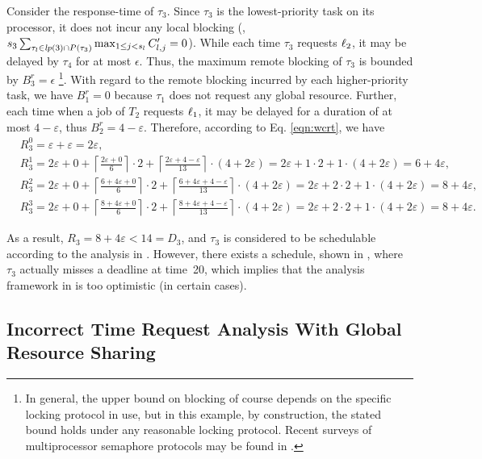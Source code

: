 Consider the response-time of $\tau_3$. Since $\tau_3$ is the lowest-priority task on its processor, it does not incur any local blocking (\ie,$s_3 \sum_{\tau_l \in \mathit{lp}(3) \cap P(\tau_3)} \max_{1 \leq j < s_l} C_{l,j}^{\prime} = 0$). While each time $\tau_3$ requests $\ell_2$, it may be delayed by $\tau_4$ for at most $\epsilon$. Thus, the maximum remote blocking of $\tau_3$ is bounded by $B_3^r = \epsilon$ \footnote{In general, the upper bound on blocking of course depends on the specific locking protocol in use, but in this example, by construction, the stated bound holds under any reasonable locking protocol. Recent surveys of multiprocessor semaphore protocols may be found in \cite{bbb-2013,yang-2015}.}. With regard to the remote blocking incurred by each higher-priority task, we have $B_1^r = 0$ because $\tau_1$ does not request any global resource. Further, each time when a job of $T_2$ requests $\ell_1$, it may be delayed for a duration of at most $4-\varepsilon$, thus $B_2^r = 4-\varepsilon$. Therefore, according to Eq. \ref{eqn:wcrt}, we have
\begin{align*}
& R_3^0 = \varepsilon + \varepsilon = 2\varepsilon, \\
& R_3^1 = 2\varepsilon + 0 + \left \lceil \frac{2\varepsilon + 0}{6} \right \rceil \cdot 2 + \left \lceil \frac{2\varepsilon + 4 - \varepsilon}{13} \right \rceil \cdot (4+2\varepsilon) = 2\varepsilon + 1 \cdot 2 + 1 \cdot (4+2\varepsilon) = 6+4\varepsilon, \\
& R_3^2 = 2\varepsilon + 0 + \left \lceil \frac{6+4\varepsilon + 0}{6} \right \rceil \cdot 2 + \left \lceil \frac{6+4\varepsilon + 4-\varepsilon}{13} \right \rceil \cdot (4+2\varepsilon) = 2\varepsilon + 2 \cdot 2 + 1 \cdot (4+2\varepsilon) = 8+4\varepsilon, \\
& R_3^3 = 2\varepsilon + 0 + \left \lceil \frac{8+4\varepsilon + 0}{6} \right \rceil \cdot 2 + \left \lceil \frac{8+4\varepsilon + 4-\varepsilon}{13} \right \rceil \cdot (4+2\varepsilon) = 2\varepsilon + 2 \cdot 2 + 1 \cdot (4+2\varepsilon) = 8+4\varepsilon.
\end{align*}
 
As a result, $R_3 = 8+4\varepsilon < 14 = D_3$, and $\tau_3$ is considered to be schedulable according to the analysis in \cite{lakshmanan-2009}. However, there exists a schedule, shown in , where $\tau_3$  actually misses a deadline at time~20, which implies that the analysis framework in \cite{lakshmanan-2009} is too optimistic (in certain cases). 

\subsection{Incorrect Time Request Analysis With Global Resource Sharing}

